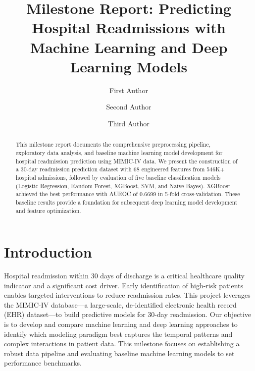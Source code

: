 \documentclass[runningheads]{llncs}
\begin{document}
%
\title{Milestone Report: Predicting Hospital Readmissions with Machine Learning and Deep Learning Models}
%
%
\author{First Author \and
Second Author \and
Third Author}
%
%
%
\maketitle              %
%
\begin{abstract}
This milestone report documents the comprehensive preprocessing pipeline, exploratory data analysis, and baseline machine learning model development for hospital readmission prediction using MIMIC-IV data. We present the construction of a 30-day readmission prediction dataset with 68 engineered features from 546K+ hospital admissions, followed by evaluation of five baseline classification models (Logistic Regression, Random Forest, XGBoost, SVM, and Naive Bayes). XGBoost achieved the best performance with AUROC of 0.6699 in 5-fold cross-validation. These baseline results provide a foundation for subsequent deep learning model development and feature optimization.
\end{abstract}

\section{Introduction}

Hospital readmission within 30 days of discharge is a critical healthcare quality indicator and a significant cost driver. Early identification of high-risk patients enables targeted interventions to reduce readmission rates. This project leverages the MIMIC-IV database—a large-scale, de-identified electronic health record (EHR) dataset—to build predictive models for 30-day readmission. Our objective is to develop and compare machine learning and deep learning approaches to identify which modeling paradigm best captures the temporal patterns and complex interactions in patient data. This milestone focuses on establishing a robust data pipeline and evaluating baseline machine learning models to set performance benchmarks.
\end{document}
